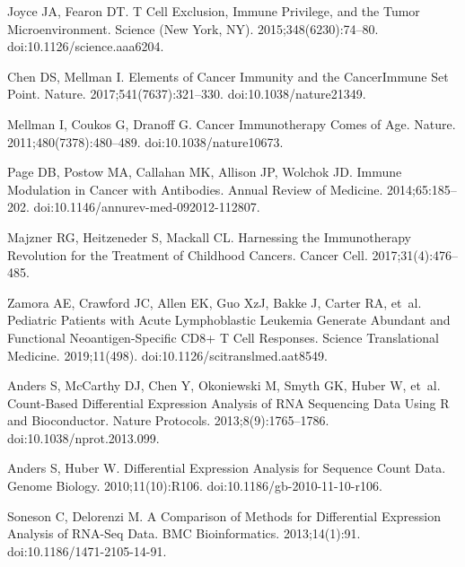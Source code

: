 \documentclass[10pt,letterpaper]{article}
\begin{document}
\begin{thebibliography}{10}
	Joyce JA, Fearon DT.
	\newblock T Cell Exclusion, Immune Privilege, and the Tumor Microenvironment.
	\newblock Science (New York, NY). 2015;348(6230):74--80.
	\newblock doi:{10.1126/science.aaa6204}.

	Chen DS, Mellman I.
	\newblock Elements of Cancer Immunity and the Cancer\textendash{}Immune Set
	Point.
	\newblock Nature. 2017;541(7637):321--330.
	\newblock doi:{10.1038/nature21349}.

	Mellman I, Coukos G, Dranoff G.
	\newblock Cancer Immunotherapy Comes of Age.
	\newblock Nature. 2011;480(7378):480--489.
	\newblock doi:{10.1038/nature10673}.

	Page DB, Postow MA, Callahan MK, Allison JP, Wolchok JD.
	\newblock Immune Modulation in Cancer with Antibodies.
	\newblock Annual Review of Medicine. 2014;65:185--202.
	\newblock doi:{10.1146/annurev-med-092012-112807}.

	Majzner RG, Heitzeneder S, Mackall CL.
	\newblock Harnessing the Immunotherapy Revolution for the Treatment of
	Childhood Cancers.
	\newblock Cancer Cell. 2017;31(4):476--485.

	Zamora AE, Crawford JC, Allen EK, Guo XzJ, Bakke J, Carter RA, et~al.
	\newblock Pediatric Patients with Acute Lymphoblastic Leukemia Generate
	Abundant and Functional Neoantigen-Specific {{CD8}}+ {{T}} Cell Responses.
	\newblock Science Translational Medicine. 2019;11(498).
	\newblock doi:{10.1126/scitranslmed.aat8549}.

	Anders S, McCarthy DJ, Chen Y, Okoniewski M, Smyth GK, Huber W, et~al.
	\newblock Count-Based Differential Expression Analysis of {{RNA}} Sequencing
	Data Using {{R}} and {{Bioconductor}}.
	\newblock Nature Protocols. 2013;8(9):1765--1786.
	\newblock doi:{10.1038/nprot.2013.099}.

	Anders S, Huber W.
	\newblock Differential Expression Analysis for Sequence Count Data.
	\newblock Genome Biology. 2010;11(10):R106.
	\newblock doi:{10.1186/gb-2010-11-10-r106}.

	Soneson C, Delorenzi M.
	\newblock A Comparison of Methods for Differential Expression Analysis of
	{{RNA}}-Seq Data.
	\newblock BMC Bioinformatics. 2013;14(1):91.
	\newblock doi:{10.1186/1471-2105-14-91}.


\end{thebibliography}
\end{document}

